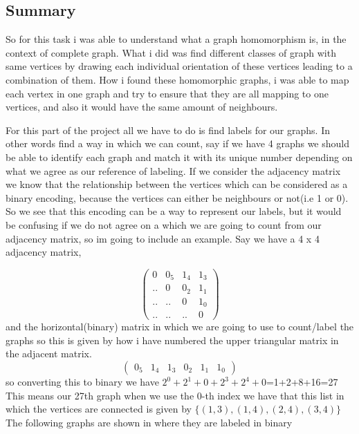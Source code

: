 \documentclass{Assignment}
\begin{document}
\subsection*{Summary}
So for this task i was able to understand what a graph homomorphism is, in the context of complete graph. What i did was find different classes of graph with same vertices by drawing each individual orientation of these vertices leading to a combination of them. How i found these homomorphic graphs, i was able to map each vertex in one graph and try to ensure that they are all mapping to one vertices, and also it would have the same amount of neighbours.\newpage

For this part of the project all we have to do is find labels for our graphs. In other words find a way in which we can count, say if we have 4 graphs we should be able to identify each graph and match it with its unique number depending on what we agree as our reference of labeling. If we consider the adjacency matrix we know that the relationship between the vertices which can be considered as a binary encoding, because the vertices can either be neighbours or not(i.e 1 or 0).\\
So we see that this encoding can be a way to represent our labels, but it would be confusing if we do not agree on a which we are going to count from our adjacency matrix, so im going to include an example. Say we have a 4 x 4 adjacency matrix,

$$\begin{pmatrix}
	0&0_5&1_4&1_3\\
	..&0&0_2&1_1\\
	..&..&0&1_0\\
	..&..&..&0
\end{pmatrix}$$
and the horizontal(binary) matrix in which we are going to use to count/label the graphs so this is given by how i have numbered the upper triangular matrix in the adjacent matrix.$$
\begin{pmatrix}
	0_5&1_4&1_3&0_2&1_1&1_0
\end{pmatrix}$$ so converting this to binary we have $2^0+2^1+0+2^3+2^4+0$=1+2+8+16=27\\This means our 27th graph when we use the 0-th index we have that this list in which the vertices are connected is given by $\{(1,3),(1,4),(2,4),(3,4)\}$\\The following graphs are shown in where they are labeled in binary

\end{document}
